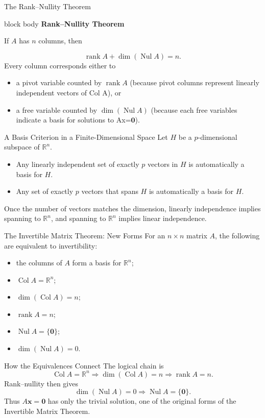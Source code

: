\documentclass[aspectratio=169]{beamer}
\newcommand{\R}{\mathbb{R}}
\newcommand{\vect}[1]{\mathbf{#1}}
\newcommand{\Col}{\operatorname{Col}}
\newcommand{\Nul}{\operatorname{Nul}}
\newcommand{\rank}{\operatorname{rank}}
\newcommand{\theorembox}[2]{%
  \begin{beamercolorbox}[sep=1.2ex,wd=\linewidth]{block body}
    \textbf{#1}\par #2
  \end{beamercolorbox}}
\begin{document}
\begin{frame}{The Rank--Nullity Theorem}
\theorembox{Rank--Nullity Theorem}{If $A$ has $n$ columns, then}
\[
\boxed{\rank A+\dim(\Nul A)=n}.
\]
\pause
Every column corresponds either to
\begin{itemize}
  \item a pivot variable counted by $\rank A$ (because pivot columns represent linearly independent vectors of Col A), or
  \item a free variable counted by $\dim(\Nul A)$ (because each free variables indicate a basis for solutions to Ax=$\vect 0$).
\end{itemize}
\end{frame}

\begin{frame}{A Basis Criterion in a Finite-Dimensional Space}
Let $H$ be a $p$-dimensional subspace of $\R^n$.
\begin{itemize}
  \item Any linearly independent set of exactly $p$ vectors in $H$ is automatically a basis for $H$.
  \item Any set of exactly $p$ vectors that spans $H$ is automatically a basis for $H$.
\end{itemize}
\pause
Once the number of vectors matches the dimension, linearly independence implies spanning to $\mathbb{R}^n$, and spanning to $\mathbb{R}^n$ implies linear independence.
\end{frame}

\begin{frame}{The Invertible Matrix Theorem: New Forms}
For an $n\times n$ matrix $A$, the following are equivalent to invertibility:
\begin{itemize}
  \item the columns of $A$ form a basis for $\R^n$;
  \item $\Col A=\R^n$;
  \item $\dim(\Col A)=n$;
  \item $\rank A=n$;
  \item $\Nul A=\{\vect0\}$;
  \item $\dim(\Nul A)=0$.
\end{itemize}
\end{frame}

\begin{frame}{How the Equivalences Connect}
The logical chain is
\[
\Col A=\R^n
\Longrightarrow
\dim(\Col A)=n
\Longrightarrow
\rank A=n.
\]
Rank--nullity then gives
\[
\dim(\Nul A)=0
\Longrightarrow
\Nul A=\{\vect0\}.
\]
Thus $A\vect x=\vect0$ has only the trivial solution, one of the original forms of the Invertible Matrix Theorem.
\end{frame}
\end{document}
